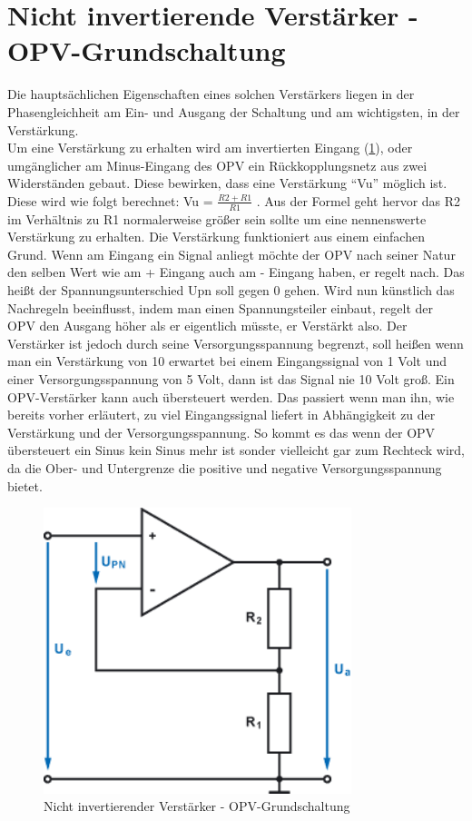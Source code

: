 \section{Nicht invertierende Verstärker - OPV-Grundschaltung}\label{sec:3.5}
Die hauptsächlichen Eigenschaften eines solchen Verstärkers liegen in der Phasengleichheit am Ein- und Ausgang der Schaltung und am wichtigsten, in der Verstärkung. \\
Um eine Verstärkung zu erhalten wird am invertierten Eingang (\ref{fig:3.5.1}), oder umgänglicher am Minus-Eingang des OPV ein Rückkopplungsnetz aus zwei Widerständen gebaut.
Diese bewirken, dass eine Verstärkung \enquote{Vu} möglich ist.
Diese wird wie folgt berechnet: Vu = $\frac{R2+R1}{R1}$ .
Aus der Formel geht hervor das R2 im Verhältnis zu R1 normalerweise größer sein sollte um eine nennenswerte Verstärkung zu erhalten.
Die Verstärkung funktioniert aus einem einfachen Grund.
Wenn am Eingang ein Signal anliegt möchte der OPV nach seiner Natur den selben Wert wie am + Eingang auch am - Eingang haben, er regelt nach.
Das heißt der Spannungsunterschied Upn soll gegen 0 gehen.
Wird nun künstlich das Nachregeln beeinflusst, indem man einen Spannungsteiler einbaut, regelt der OPV den Ausgang höher als er eigentlich müsste, er Verstärkt also.
Der Verstärker ist jedoch durch seine Versorgungsspannung begrenzt, soll heißen wenn man ein Verstärkung von 10 erwartet bei einem Eingangssignal von 1 Volt und einer Versorgungsspannung von 5 Volt, dann ist das Signal nie 10 Volt groß.
Ein OPV-Verstärker kann auch übersteuert werden.
Das passiert wenn man ihn, wie bereits vorher erläutert, zu viel Eingangssignal liefert in Abhängigkeit zu der Verstärkung und der Versorgungsspannung.
So kommt es das wenn der OPV übersteuert ein Sinus kein Sinus mehr ist sonder vielleicht gar zum Rechteck wird, da die Ober- und Untergrenze die positive und negative Versorgungsspannung bietet.
\begin{figure} [H]
	\centering	
	\includegraphics[width=0.8\textwidth]{img/Grundlagen/OPV-Verstaerker/OPV-VerstaerkerGrundschaltung.png}
	\caption[Nicht invertierender Verstärker - OPV-Grundschaltung]{Nicht invertierender Verstärker - OPV-Grundschaltung\footnotemark}
	\label {fig:3.5.1}
\end{figure}
